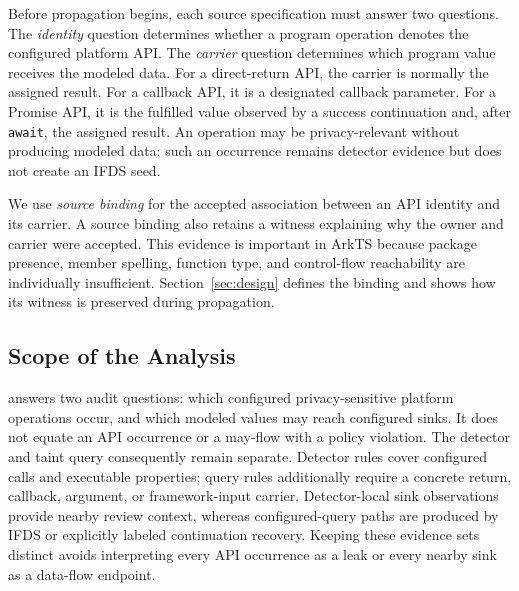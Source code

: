 Before propagation begins, each source specification must answer two questions. The \emph{identity} question determines whether a program operation denotes the configured platform API. The \emph{carrier} question determines which program value receives the modeled data. For a direct-return API, the carrier is normally the assigned result. For a callback API, it is a designated callback parameter. For a Promise API, it is the fulfilled value observed by a success continuation and, after \texttt{await}, the assigned result. An operation may be privacy-relevant without producing modeled data; such an occurrence remains detector evidence but does not create an IFDS seed.

We use \emph{source binding} for the accepted association between an API identity and its carrier. A source binding also retains a witness explaining why the owner and carrier were accepted. This evidence is important in ArkTS because package presence, member spelling, function type, and control-flow reachability are individually insufficient. Section~\ref{sec:design} defines the binding and shows how its witness is preserved during propagation.

\subsection{Scope of the Analysis}

\mytool answers two audit questions: which configured privacy-sensitive platform operations occur, and which modeled values may reach configured sinks. It does not equate an API occurrence or a may-flow with a policy violation. The detector and taint query consequently remain separate. Detector rules cover configured calls and executable properties; query rules additionally require a concrete return, callback, argument, or framework-input carrier. Detector-local sink observations provide nearby review context, whereas configured-query paths are produced by IFDS or explicitly labeled continuation recovery. Keeping these evidence sets distinct avoids interpreting every API occurrence as a leak or every nearby sink as a data-flow endpoint.
